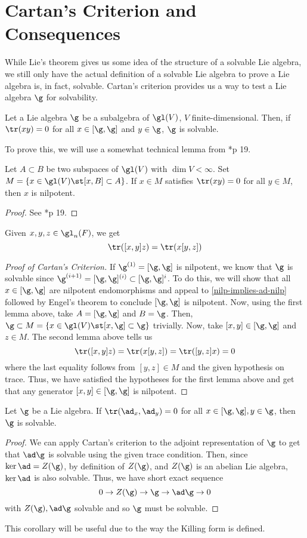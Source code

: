 \documentclass[11pt,leqno,oneside]{amsart}
\numberwithin{thm}{section}
\begin{document}
\section{Cartan's Criterion and Consequences}
While Lie's theorem gives us some idea of the structure of a solvable
Lie algebra, we still only have the actual definition of a solvable
Lie algebra to prove a Lie algebra is, in fact, solvable. Cartan's
criterion provides us a way to test a Lie algebra \(\g\) for
solvability.
\begin{thm}
  Let a Lie algebra \(\g\) be a subalgebra of \(\gl(V)\), \(V\)
  finite-dimensional. Then, if \(\tr(xy) = 0\) for all \(x \in
  [\g,\g]\) and \(y \in \g\), \(\g\) is solvable.
\end{thm}
To prove this, we will use a somewhat technical lemma from
\cite{humph}*{p 19}.
\begin{lem}
  Let \(A \subset B\) be two subspaces of \(\gl(V)\) with \(\dim V <
  \infty\). Set \(M = \{x \in \gl(V) \st [x,B] \subset A\}\). If \(x
  \in M\) satisfies \(\tr(xy) = 0\) for all \(y \in M\), then \(x\) is
  nilpotent. 
\end{lem}
\begin{proof}
  See \cite{humph}*{p 19}.  
\end{proof}
\begin{lem}
  Given \(x,y,z \in \gl_n(F)\), we get \[
    \tr([x,y]z) = \tr(x[y,z])
  \]
\end{lem}
\begin{proof}[Proof of Cartan's Criterion]
  If \(\g^{(1)} = [\g,\g]\) is nilpotent, we know that \(\g\) is
  solvable since \(\g^{(i+1)} = [\g,\g]^{(i)} \subset [\g,\g]^i\). To
  do this, we will show that all \(x \in [\g,\g]\) are nilpotent
  endomorphisms and appeal to \ref{nilp-implies-ad-nilp} followed by
  Engel's theorem to conclude \([\g,\g]\) is nilpotent. Now, using the
  first lemma above, take \(A = [\g,\g]\) and \(B = \g\). Then, \(\g \subset
  M = \{x \in \gl(V) \st [x,\g] \subset \g\}\) trivially. Now, take
  \([x,y] \in [\g,\g]\) and \(z \in M\). The second lemma above tells
  us \[
    \tr([x,y]z) = \tr(x[y,z]) = \tr([y,z]x) = 0
  \]
  where the last equality follows from \([y,z] \in M\) and the given
  hypothesis on trace. Thus, we have satisfied the hypotheses for the first
  lemma above and get that any generator \([x,y] \in [\g,\g]\) is nilpotent.
\end{proof}
\begin{cor}\label{killing-form-degenerate-on-derived-implies-solvable}
  Let \(\g\) be a Lie algebra. If \(\tr(\ad_x, \ad_y) = 0\) for
  all \(x \in [\g,\g], y \in \g\), then \(\g\) is solvable.
\end{cor}
\begin{proof}
  We can apply Cartan's criterion to the adjoint representation of
  \(\g\) to get that \(\ad \g\) is solvable using the given trace
  condition. Then, since \(\ker \ad = Z(\g)\), by definition of
  \(Z(\g)\), and \(Z(\g)\) is an abelian Lie algebra, \(\ker \ad\) is
  also solvable. Thus, we have short exact sequence \[
    0 \to Z(\g) \to \g \to \ad \g \to 0
  \]
  with \(Z(\g), \ad \g\) solvable and so \(\g\) must be solvable.
\end{proof}
This corollary will be useful due to the way the Killing form is defined.
\end{document}
